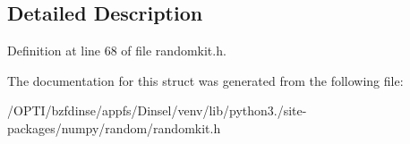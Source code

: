 \subsection{Detailed Description}


Definition at line 68 of file randomkit.\+h.



The documentation for this struct was generated from the following file\+:\begin{DoxyCompactItemize}
\item 
/\+O\+P\+T\+I/bzfdinse/appfs/\+Dinsel/venv/lib/python3./site-\/packages/numpy/random/randomkit.\+h\end{DoxyCompactItemize}
